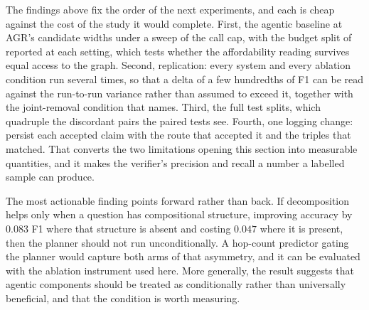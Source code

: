 The findings above fix the order of the next experiments, and each is
cheap against the cost of the study it would complete. First, the
agentic baseline at AGR's candidate widths under a sweep of the call
cap, with the budget split of  reported at each
setting, which tests whether the affordability reading survives equal
access to the graph. Second, replication: every system and every
ablation condition run several times, so that a delta of a few
hundredths of F1 can be read against the run-to-run variance rather than
assumed to exceed it, together with the joint-removal condition that
 names. Third, the full test splits, which quadruple the
discordant pairs the paired tests see. Fourth, one logging change:
persist each accepted claim with the route that accepted it and the
triples that matched. That converts the two limitations opening this
section into measurable quantities, and it makes the verifier's
precision and recall a number a labelled sample can produce.

The most actionable finding points forward rather than back. If
decomposition helps only when a question has compositional structure,
improving accuracy by $0.083$ F1 where that structure is absent and
costing $0.047$ where it is present, then the planner should not run
unconditionally. A hop-count predictor gating the planner would capture
both arms of that asymmetry, and it can be evaluated with the ablation
instrument used here. More generally, the result suggests that agentic
components should be treated as conditionally rather than universally
beneficial, and that the condition is worth measuring.
